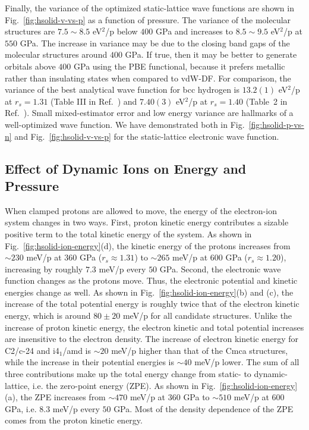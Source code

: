 Finally, the variance of the optimized static-lattice wave functions are shown in Fig.~\ref{fig:hsolid-v-vs-p} as a function of pressure.
The variance of the molecular structures are $7.5\sim8.5$ eV$^2$/p below $400$ GPa and increases to $8.5\sim9.5$ eV$^2$/p at $550$ GPa.
The increase in variance may be due to the closing band gaps of the molecular structures around $400$ GPa.
If true, then it may be better to generate orbitals above $400$ GPa using the PBE functional, because it prefers metallic rather than insulating states when compared to vdW-DF.
For comparison, the variance of the best analytical wave function for bcc hydrogen is $13.2(1)$ eV$^2$/p at $r_s=1.31$ (Table III in Ref.~\cite{Holzmann2003}) and $7.40(3)$ eV$^2$/p at $r_s=1.40$ (Table~2 in Ref.~\cite{Pierleoni2008}).
Small mixed-estimator error and low energy variance are hallmarks of a well-optimized wave function. We have demonstrated both in Fig.~\ref{fig:hsolid-p-vs-n} and Fig.~\ref{fig:hsolid-v-vs-p} for the static-lattice electronic wave function.

\subsection{Effect of Dynamic Ions on Energy and Pressure}

When clamped protons are allowed to move, the energy of the electron-ion system changes in two ways.
First, proton kinetic energy contributes a sizable positive term to the total kinetic energy of the system. As shown in Fig.~\ref{fig:hsolid-ion-energy}(d), the kinetic energy of the protons increases from $\sim 230$ meV/p at $360$ GPa ($r_s\approx 1.31$) to $\sim 265$ meV/p at $600$ GPa ($r_s\approx 1.20$), increasing by roughly $7.3$ meV/p every $50$ GPa.
Second, the electronic wave function changes as the protons move. Thus, the electronic potential and kinetic energies change as well.
As shown in Fig.~\ref{fig:hsolid-ion-energy}(b) and (c), the increase of the total potential energy is roughly twice that of the electron kinetic energy, which is around $80\pm20$ meV/p for all candidate structures.
Unlike the increase of proton kinetic energy, the electron kinetic and total potential increases are insensitive to the electron density.
The increase of electron kinetic energy for C2/c-24 and i4$_1$/amd is $\sim 20$ meV/p higher than that of the Cmca structures, while the increase in their potential energies is $\sim 40$ meV/p lower.
The sum of all three contributions make up the total energy change from static- to dynamic-lattice, i.e. the zero-point energy (ZPE).
As shown in Fig.~\ref{fig:hsolid-ion-energy}(a), the ZPE increases from $\sim 470$ meV/p at $360$ GPa to $\sim 510$ meV/p at $600$ GPa, i.e. $8.3$ meV/p every $50$ GPa.
Most of the density dependence of the ZPE comes from the proton kinetic energy.

